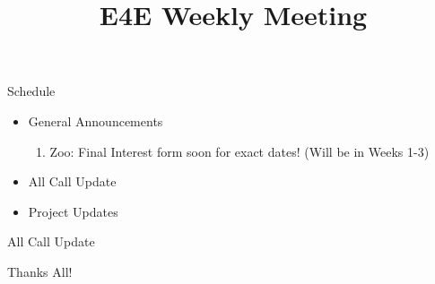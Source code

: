 \documentclass[aspectratio=169]{beamer}
\title{E4E Weekly Meeting}
\institute{UC San Diego}
\begin{document}
\maketitle
\begin{frame}{Schedule}
    \begin{itemize}
        \item General Announcements
              \begin{enumerate}
                \item{Zoo: Final Interest form soon for exact dates! (Will be in Weeks 1-3)}
              \end{enumerate}
        \item All Call Update
              \begin{enumerate}
                  
              \end{enumerate}
        \item Project Updates
              \begin{enumerate}
                  
              \end{enumerate}
    \end{itemize}
\end{frame}

\begin{frame}{All Call Update}
    \begin{enumerate}
        
    \end{enumerate}
\end{frame}

\begin{frame}
    \centering
    Thanks All!
\end{frame}
\end{document}
